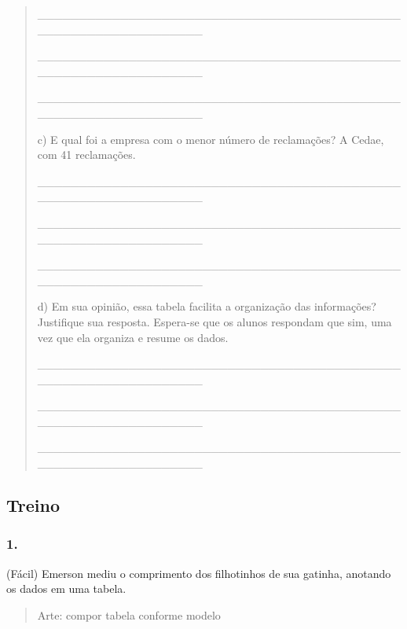 \begin{quote}
\_\_\_\_\_\_\_\_\_\_\_\_\_\_\_\_\_\_\_\_\_\_\_\_\_\_\_\_\_\_\_\_\_\_\_\_\_\_\_\_\_\_\_\_\_\_\_\_\_\_\_\_\_\_\_\_\_\_\_\_\_\_\_\_

\_\_\_\_\_\_\_\_\_\_\_\_\_\_\_\_\_\_\_\_\_\_\_\_\_\_\_\_\_\_\_\_\_\_\_\_\_\_\_\_\_\_\_\_\_\_\_\_\_\_\_\_\_\_\_\_\_\_\_\_\_\_\_\_

\_\_\_\_\_\_\_\_\_\_\_\_\_\_\_\_\_\_\_\_\_\_\_\_\_\_\_\_\_\_\_\_\_\_\_\_\_\_\_\_\_\_\_\_\_\_\_\_\_\_\_\_\_\_\_\_\_\_\_\_\_\_\_\_

c) E qual foi a empresa com o menor número de reclamações? A Cedae, com
41 reclamações.

\protect\hypertarget{_Hlk128145702}{}{}\_\_\_\_\_\_\_\_\_\_\_\_\_\_\_\_\_\_\_\_\_\_\_\_\_\_\_\_\_\_\_\_\_\_\_\_\_\_\_\_\_\_\_\_\_\_\_\_\_\_\_\_\_\_\_\_\_\_\_\_\_\_\_\_

\_\_\_\_\_\_\_\_\_\_\_\_\_\_\_\_\_\_\_\_\_\_\_\_\_\_\_\_\_\_\_\_\_\_\_\_\_\_\_\_\_\_\_\_\_\_\_\_\_\_\_\_\_\_\_\_\_\_\_\_\_\_\_\_

\_\_\_\_\_\_\_\_\_\_\_\_\_\_\_\_\_\_\_\_\_\_\_\_\_\_\_\_\_\_\_\_\_\_\_\_\_\_\_\_\_\_\_\_\_\_\_\_\_\_\_\_\_\_\_\_\_\_\_\_\_\_\_\_

d) Em sua opinião, essa tabela facilita a organização das informações?
Justifique sua resposta. Espera-se que os alunos respondam que sim, uma
vez que ela organiza e resume os dados.

\_\_\_\_\_\_\_\_\_\_\_\_\_\_\_\_\_\_\_\_\_\_\_\_\_\_\_\_\_\_\_\_\_\_\_\_\_\_\_\_\_\_\_\_\_\_\_\_\_\_\_\_\_\_\_\_\_\_\_\_\_\_\_\_

\_\_\_\_\_\_\_\_\_\_\_\_\_\_\_\_\_\_\_\_\_\_\_\_\_\_\_\_\_\_\_\_\_\_\_\_\_\_\_\_\_\_\_\_\_\_\_\_\_\_\_\_\_\_\_\_\_\_\_\_\_\_\_\_

\_\_\_\_\_\_\_\_\_\_\_\_\_\_\_\_\_\_\_\_\_\_\_\_\_\_\_\_\_\_\_\_\_\_\_\_\_\_\_\_\_\_\_\_\_\_\_\_\_\_\_\_\_\_\_\_\_\_\_\_\_\_\_\_
\end{quote}

\subsection{Treino}\label{treino-8}

\subsubsection{1.}\label{section-68}

(Fácil) Emerson mediu o comprimento dos filhotinhos de sua gatinha,
anotando os dados em uma tabela.

\begin{quote}
Arte: compor tabela conforme modelo
\end{quote}

